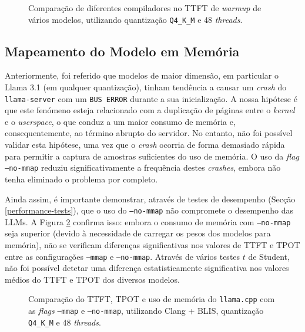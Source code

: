 \documentclass[11pt, a4paper]{article}
\begin{document}
\begin{figure}[H]
    \centering
    
    \caption{
        \onehalfspacing
        Comparação de diferentes compiladores no TTFT de \emph{warmup} de vários modelos, utilizando
        quantização \texttt{Q4\_K\_M} e 48 \emph{threads}.
    }
    \label{compiler-blis}
\end{figure}

\subsection{Mapeamento do Modelo em Memória}

Anteriormente, foi referido que modelos de maior dimensão, em particular o Llama 3.1 (em qualquer
quantização), tinham tendência a causar um \emph{crash} do \texttt{llama-server} com um
\texttt{BUS ERROR} durante a sua inicialização. A nossa hipótese é que este fenómeno esteja
relacionado com a duplicação de páginas entre o \emph{kernel} e o \emph{userspace}, o que conduz a
um maior consumo de memória e, consequentemente, ao término abrupto do servidor. No entanto, não foi
possível validar esta hipótese, uma vez que o \emph{crash} ocorria de forma demasiado rápida para
permitir a captura de amostras suficientes do uso de memória. O uso da \emph{flag}
\texttt{--no-mmap} reduziu significativamente a frequência destes \emph{crashes}, embora não tenha
eliminado o problema por completo.

Ainda assim, é importante demonstrar, através de testes de desempenho (Secção
\ref{performance-tests}), que o uso do \texttt{--no-mmap} não compromete o desempenho das LLMs. A
Figura \ref{mmap-results} confirma isso: embora o consumo de memória com \texttt{--no-mmap} seja
superior (devido à necessidade de carregar os pesos dos modelos para memória), não se verificam
diferenças significativas nos valores de TTFT e TPOT entre as configurações \texttt{--mmap} e
\texttt{--no-mmap}. Através de vários testes $t$ de Student, não foi possível detetar uma diferença
estatisticamente significativa nos valores médios do TTFT e TPOT dos diversos modelos.

\begin{figure}[H]
    \centering
    
\end{figure}
\begin{figure}[H]
    \centering
    
    
    \vspace{-\baselineskip}
    \caption{
        \onehalfspacing
        Comparação do TTFT, TPOT e uso de memória do \texttt{llama.cpp} com as \emph{flags}
        \texttt{--mmap} e \texttt{--no-mmap}, utilizando Clang + BLIS, quantização \texttt{Q4\_K\_M}
        e 48 \emph{threads}.
    }
    \label{mmap-results}
\end{figure}
\end{document}
